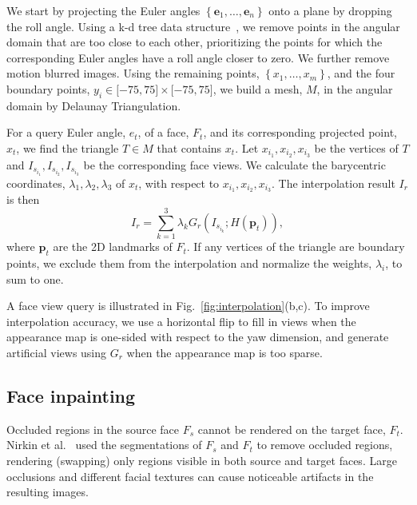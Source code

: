 We start by projecting the Euler angles $\left\{ \mathbf{e}_{1},\dots ,\mathbf{e}_{n}\right\} $ onto a plane by dropping the roll angle. Using a k-d tree data structure~\cite{hughes2014computer}, we remove points in the angular domain that are too close to each other, prioritizing the points for which the corresponding Euler angles have a roll angle closer to zero. We further remove motion blurred images. Using the remaining points, $\left\{ x_{1},\dots ,x_{m}\right\}$, and the four boundary points, $y_{i}\in \lbrack -75,75]\times \lbrack -75,75]$, we build a
mesh, $M$, in the angular domain by Delaunay Triangulation.

For a query Euler angle, $e_{t}$, of a face, $F_{t}$, and its corresponding projected point, $x_{t}$, we find the triangle $T\in M$ that contains $x_{t}$. Let $x_{i_{1}},x_{i_{2}},x_{i_{3}}$ be the vertices of $T$ and $I_{s_{i_{1}}},I_{s_{i_{2}}},I_{s_{i_{3}}}$ be the corresponding face views. We calculate the barycentric coordinates, $\lambda _{1},\lambda _{2},\lambda
_{3}$ of $x_{t}$, with respect to $x_{i_{1}},x_{i_{2}},x_{i_{3}}$. The
interpolation result $I_{r}$ is then
\begin{equation}
I_{r}=\sum_{k=1}^{3}\lambda _{k}G_{r}(I_{s_{i_{k}}};H(\mathbf{p}_{t})),
\end{equation}
where $\mathbf{p}_{t}$ are the 2D landmarks of $F_{t}$. If any vertices of the triangle are boundary points, we exclude them from the interpolation and normalize the weights, $\lambda _{i}$, to sum to one. 

A face view query is illustrated in Fig.~\ref{fig:interpolation}(b,c). To improve interpolation accuracy, we use a horizontal flip to fill in views when the appearance map is one-sided with respect to the yaw dimension, and generate artificial views using $G_{r}$ when the appearance map is too sparse.

\subsection{Face inpainting}
\label{subsec:inpainting}
Occluded regions in the source face $F_{s}$ cannot be rendered on the target face, $F_{t}$. Nirkin et al.~\cite{nirkin2018face} used the segmentations of $F_{s}$ and $F_{t}$ to remove occluded regions, rendering (swapping) only regions visible in both source and target faces. %
Large occlusions and different facial textures can cause noticeable artifacts in the resulting images. 

